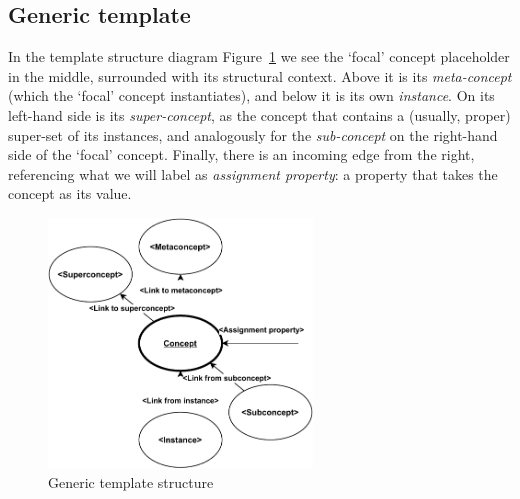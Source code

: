 \subsection{Generic template}
\label{ss:template}

In the template structure diagram Figure~\ref{fig:conc_diag_templ} we see the `focal' concept placeholder in the middle, surrounded with its structural context.
Above it is its \emph{meta-concept} (which the `focal' concept instantiates), and below it is its own \emph{instance}.
On its left-hand side is its \emph{super-concept}, as the concept that contains a (usually, proper) super-set of its instances, and analogously for the \emph{sub-concept} on the right-hand side of the `focal' concept.
Finally, there is an incoming edge from the right, referencing what we will label as \emph{assignment property}: a property that takes the concept as its value.


\begin{figure}[h]
\centering
\includegraphics[width=7cm]{figures/conc_diag_templ.pdf}
\caption{Generic template structure}
\label{fig:conc_diag_templ}
\end{figure}

